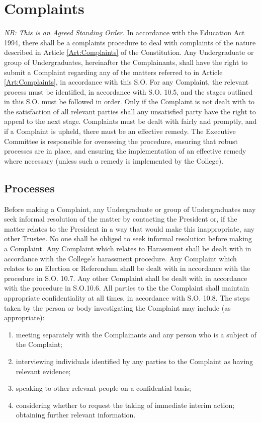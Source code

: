 \chapter{Complaints}
\hspace*{-10pt}\textit{NB: This is an Agreed Standing Order.}
\npara In accordance with the Education Act 1994, there shall be a complaints procedure to deal with complaints of the nature described in Article \ref{Art:Complaints} of the Constitution.
\npara Any Undergraduate or group of Undergraduates, hereinafter the Complainants, shall have the right to submit a Complaint regarding any of the matters referred to in Article \ref{Art:Complaints}, in accordance with this S.O.
\npara For any Complaint, the relevant process must be identified, in accordance with S.O. 10.5, and the stages outlined in this S.O. must be followed in order.  Only if the Complaint is not dealt with to the satisfaction of all relevant parties shall any unsatisfied party have the right to appeal to the next stage.
\npara Complaints must be dealt with fairly and promptly, and if a Complaint is upheld, there must be an effective remedy.  The Executive Committee is responsible for overseeing the procedure, ensuring that robust processes are in place, and ensuring the implementation of an effective remedy where necessary (unless such a remedy is implemented by the College).
\section{Processes}
\npara Before making a Complaint, any Undergraduate or group of Undergraduates may seek informal resolution of the matter by contacting the President or, if the matter relates to the President in a way that would make this inappropriate, any other Trustee.  No one shall be obliged to seek informal resolution before making a Complaint.
\npara Any Complaint which relates to Harassment shall be dealt with in accordance with the College's harassment procedure.
\npara Any Complaint which relates to an Election or Referendum shall be dealt with in accordance with the procedure in S.O. 10.7.
\npara Any other Complaint shall be dealt with in accordance with the procedure in S.O.10.6.
\npara All parties to the the Complaint shall maintain appropriate confidentiality at all times, in accordance with S.O. 10.8.
\npara The steps taken by the person or body investigating the Complaint may include (as appropriate):
\begin{enumerate}
\item meeting separately with the Complainants and any person who is a subject of the Complaint;
\item interviewing individuals identified by any parties to the Complaint as having relevant evidence;
\item speaking to other relevant people on a confidential basis;
\item considering whether to request the taking of immediate interim action;
obtaining further relevant information.
\end{enumerate}
